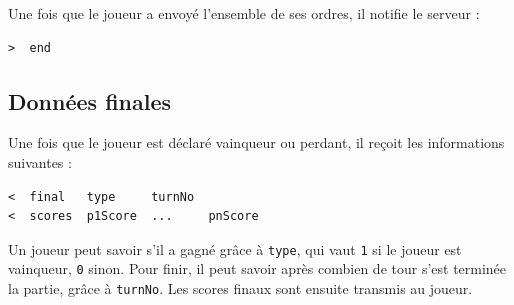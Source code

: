Une fois que le joueur a envoyé l'ensemble de ses ordres, il notifie le serveur :
\begin{lstlisting}
>  end
\end{lstlisting}



\subsection{Données finales} %
\label{final}

Une fois que le joueur est déclaré vainqueur ou perdant, il reçoit les informations suivantes :

\begin{lstlisting}
<  final   type     turnNo
<  scores  p1Score  ...     pnScore
\end{lstlisting}

Un joueur peut savoir s'il a gagné grâce à \lstinline!type!, qui vaut \lstinline!1! si le joueur est vainqueur, \lstinline!0! sinon.
Pour finir, il peut savoir après combien de tour s'est terminée la partie, grâce à \lstinline!turnNo!.
Les scores finaux sont ensuite transmis au joueur.



